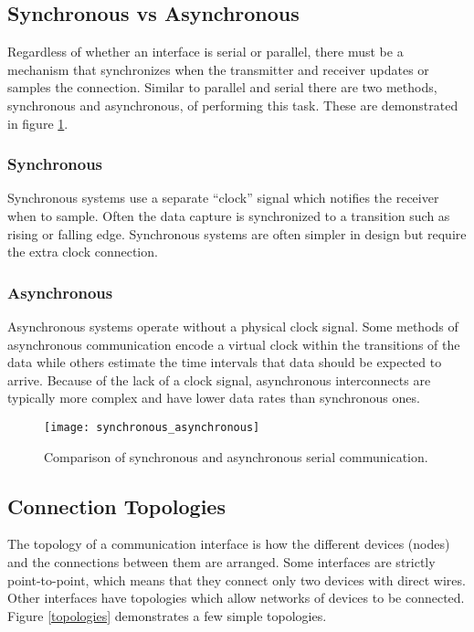 \documentclass[11pt,fleqn]{book} %
\begin{document}
\subsection{Synchronous vs Asynchronous}

Regardless of whether an interface is serial or parallel, there must be a mechanism that synchronizes when the transmitter and receiver updates or samples the connection. Similar to parallel and serial there are two methods, synchronous and asynchronous, of performing this task. These are demonstrated in figure \ref{synchronous_asynchronous}.

\subsubsection{Synchronous} 
Synchronous systems use a separate ``clock'' signal which notifies the receiver when to sample.  Often the data capture is synchronized to a transition such as rising or falling edge. Synchronous systems are often simpler in design but require the extra clock connection.

\subsubsection{Asynchronous}
Asynchronous systems operate without a physical clock signal. Some methods of asynchronous communication encode a virtual clock within the transitions of the data while others estimate the time intervals that data should be expected to arrive. Because of the lack of a clock signal, asynchronous interconnects are typically more complex and have lower data rates than synchronous ones.  

\begin{figure}[]
    \centering\texttt{[image: synchronous\_asynchronous]}
    \caption{Comparison of synchronous and asynchronous serial communication.}
    \label{synchronous_asynchronous}
\end{figure}

\subsection{Connection Topologies} 
The topology of a communication interface is how the different devices (nodes) and the connections between them are arranged. Some interfaces are strictly point-to-point, which means that they connect only two devices with direct wires. Other interfaces have topologies which allow networks of devices to be connected. Figure \ref{topologies} demonstrates a few simple topologies. 
\end{document}
